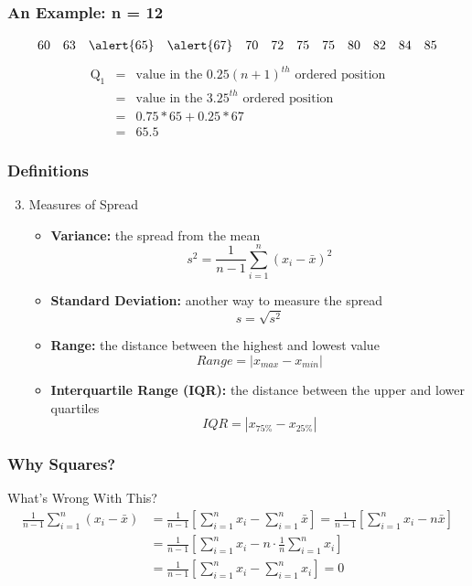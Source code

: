 \documentclass{beamer}
\begin{document}
\begin{frame}
\frametitle{An Example: n = 12}
	$$
	\begin{array}{cccccccccccc}
		60 & 63 & \alert{65} & \alert{67} & 70 & 72 & 75 & 75 & 80 & 82 & 84 & 85
	\end{array}
	$$
	\begin{eqnarray*}
		\mbox{Q}_1 &=& \mbox{value in the } 0.25(n+1)^{th}\mbox{ ordered position}\\
			&=& \mbox{value in the } 3.25^{th}\mbox{ ordered position}\\
			&=& 0.75 * 65 + 0.25 * 67\\
			&=& 65.5
	\end{eqnarray*}
\end{frame}

\begin{frame}
\frametitle{Definitions}
	\begin{enumerate}
	\setcounter{enumi}{2}
		\item Measures of Spread
		\begin{itemize}
			\item \textbf{Variance:} the spread from the mean
			$$
			s^2 = \frac{1}{n-1} \sum_{i = 1}^n (x_i - \bar{x})^2
			$$
			\item \textbf{Standard Deviation:} another way to measure the spread
			$$
			s = \sqrt{s^2}
			$$
			\item \textbf{Range:} the distance between the highest and lowest value
			$$
			Range = \left| x_{max} - x_{min} \right|
			$$
			\item \textbf{Interquartile Range (IQR):} the distance between the upper and lower 					quartiles
			$$
			IQR = \left| x_{75\%} - x_{25\%} \right|
			$$
		\end{itemize}
	\end{enumerate}
\end{frame}

 \begin{frame}
 \frametitle{Why Squares?}
	 \begin{center}
	 \end{center}
	 \begin{alertblock}{What's Wrong With This?}
	 	\begin{align*}
	 		\frac{1}{n - 1} \sum_{i = 1}^n (x_i - \bar{x}) &= \frac{1}{n - 1} \left[\sum_{i = 1}^n x_i - 					\sum_{i = 1}^n \bar{x} \right] = \frac{1}{n - 1} \left[ \sum_{i = 1}^n x_i  - n\bar{x} \right]
	 		\\
	 		&= \frac{1}{n - 1} \left[ \sum_{i = 1}^n x_i  - n \cdot \frac{1}{n} \sum_{i = 1}^n x_i \right]
	 		\\ 
	 		&= \frac{1}{n - 1} \left[ \sum_{i = 1}^n x_i  -  \sum_{i = 1}^n x_i \right] = 0
	 	\end{align*}
	 \end{alertblock}
\end{frame}
\end{document}
